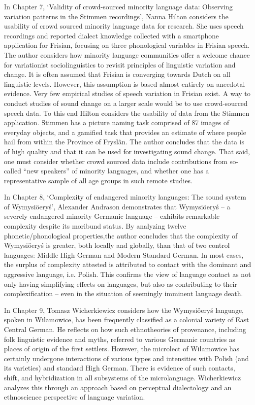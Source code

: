 \documentclass[output=paper]{langscibook}
\begin{document}
In Chapter 7, ‘Validity of crowd-sourced minority language data: Observing variation patterns in the Stimmen recordings’, Nanna Hilton considers the usability of crowd sourced minority language data for research. She uses speech recordings and reported dialect knowledge collected with a smartphone application for Frisian, focusing on three phonological variables in Frisian speech. The author considers how minority language communities offer a welcome chance for variationist sociolinguistics to revisit principles of linguistic variation and change. It is often assumed that Frisian is converging towards Dutch on all linguistic levels. However, this assumption is based almost entirely on anecdotal evidence. Very few empirical studies of speech variation in Frisian exist. A way to conduct studies of sound change on a larger scale would be to use crowd-sourced speech data. To this end Hilton considers the usability of data from the Stimmen application. Stimmen has a picture naming task comprised of 87 images of everyday objects, and a gamified task that provides an estimate of where people hail from within the Province of Fryslân. The author concludes that the data is of high quality and that it can be used for investigating sound change. That said, one must consider whether crowd sourced data include contributions from so-called ``new speakers'' of minority languages, and whether one has a representative sample of all age groups in such remote studies.

In Chapter 8, ‘Complexity of endangered minority languages: The sound system of Wymysiöeryś’, Alexander Andrason demonstrates that Wymysiöeryś – a severely endangered minority Germanic language – exhibits remarkable complexity despite its moribund status. By analyzing twelve phonetic/phonological properties,the author concludes that the complexity of Wymysiöeryś is greater, both locally and globally, than that of two control languages: Middle High German and Modern Standard German. In most cases, the surplus of complexity attested is attributed to contact with the dominant and aggressive language, i.e. Polish. This confirms the view of language contact as not only having simplifying effects on languages, but also as contributing to their complexification – even in the situation of seemingly imminent language death.

In Chapter 9, Tomasz Wicherkiewicz considers how the Wymysiöeryś language, spoken in Wilamowice, has been frequently classified as a colonial variety of East Central German. He reflects on how such ethnotheories of provenance, including folk linguistic evidence and myths, referred to various Germanic countries as places of origin of the first settlers. However, the microlect of Wilamowice has certainly undergone interactions of various types and intensities with Polish (and its varieties) and standard High German. There is evidence of such contacts, shift, and hybridization in all subsystems of the microlanguage. Wicherkiewicz analyzes this through an approach based on perceptual dialectology and an ethnoscience perspective of language variation.
\end{document}
